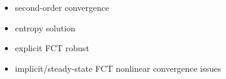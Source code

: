 \begin{itemize}
\item second-order convergence
\item entropy solution
\item explicit FCT robust
\item implicit/steady-state FCT nonlinear convergence issues
\end{itemize}
